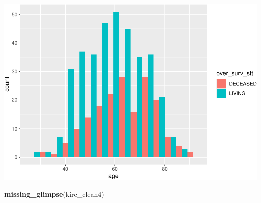 \documentclass[]{article}
\newenvironment{Shaded}{\begin{snugshade}}{\end{snugshade}}
\newcommand{\KeywordTok}[1]{\textcolor[rgb]{0.13,0.29,0.53}{\textbf{#1}}}
\newcommand{\NormalTok}[1]{#1}
\begin{document}
\includegraphics{figs/render-unnamed-chunk-13-1.pdf}

\begin{Shaded}
\begin{Highlighting}[]
\KeywordTok{missing_glimpse}\NormalTok{(kirc_clean4)}
\end{Highlighting}
\end{Shaded}
\end{document}
